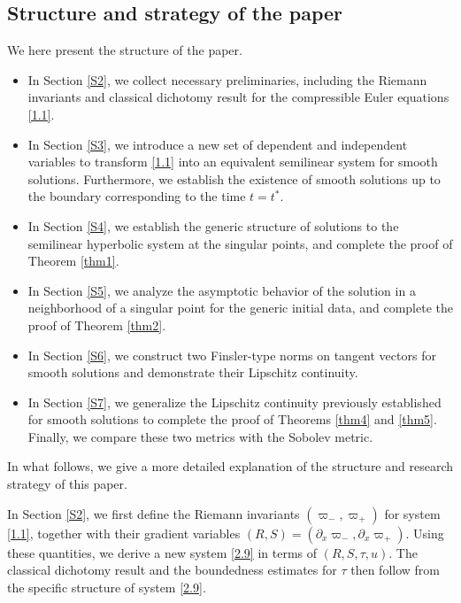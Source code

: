 \documentclass[11pt,reqno]{article}
\newcommand{\pa}{\partial}
\numberwithin{equation}{section}
\begin{document}
\subsection{Structure and strategy of the paper}\label{S13}

We here present the structure of the paper.



\begin{itemize}

\item[] In Section \ref{S2}, we collect necessary preliminaries, including the Riemann invariants and classical dichotomy result for the compressible Euler equations \eqref{1.1}.

\item[] In Section \ref{S3}, we introduce a new set of dependent and
independent variables to transform \eqref{1.1} into an equivalent semilinear system for smooth solutions. Furthermore, we establish the existence of smooth solutions up to the boundary corresponding to the time $t=t^*$.

\item[] In Section \ref{S4}, we establish the generic structure of solutions to the semilinear
hyperbolic system at the singular points, and complete the proof of Theorem \ref{thm1}.


\item[] In Section \ref{S5}, we analyze the asymptotic behavior of the solution in a neighborhood of a singular point for the generic initial data, and complete the proof of Theorem \ref{thm2}.

\item[] In Section \ref{S6}, we construct two Finsler-type norms on tangent vectors for smooth solutions and demonstrate their Lipschitz continuity.

\item[] In Section \ref{S7}, we generalize the Lipschitz continuity previously established for smooth solutions to complete the proof of Theorems \ref{thm4} and \ref{thm5}. Finally, we compare these two metrics with the Sobolev metric.

\end{itemize}

In what follows, we give a more detailed explanation of the structure and research strategy of this paper.

In Section \ref{S2}, we first define the Riemann invariants $(\varpi_-, \varpi_+)$ for system \eqref{1.1}, together with their gradient variables $(R, S)=(\pa_x\varpi_-, \pa_x\varpi_+)$. Using these quantities, we derive a new system \eqref{2.9} in terms of $(R, S, \tau, u)$. The classical dichotomy result and the boundedness estimates for $\tau$ then follow from the specific structure of system \eqref{2.9}.
\end{document}

